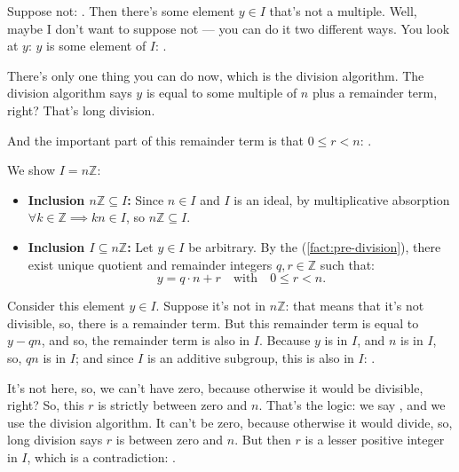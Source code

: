 \begin{proofWrapper}
\begin{speech}[00:53:46 - 00:54:50]
Suppose not: . Then there's some element $y \in I$ that's not a multiple. Well, maybe I don't want to suppose not --- you can do it two different ways. You look at $y$: $y$ is some element of $I$: .

There's only one thing you can do now, which is the division algorithm. The division algorithm says $y$ is equal to some multiple of $n$ plus a remainder term, right?  That's long division.

And the important part of this remainder term is that $0 \le r < n$: .
\end{speech}

\begin{content}
We show $I = n\mathbb{Z}$:
\begin{itemize}
    \item \textbf{Inclusion $n\mathbb{Z} \subseteq I$:} Since $n \in I$ and $I$ is an ideal, by multiplicative absorption $\forall k \in \mathbb{Z} \implies kn \in I$, so $n\mathbb{Z} \subseteq I$.
    \item \textbf{Inclusion $I \subseteq n\mathbb{Z}$:} Let $y \in I$ be arbitrary. By the  (\cref{fact:pre-division}), there exist unique quotient and remainder integers $q, r \in \mathbb{Z}$ such that:
    \begin{equation}\label{eq:division-remainder}
    y = q \cdot n + r \quad \text{with} \quad 0 \le r < n.
    \end{equation}
\end{itemize}
\end{content}

\begin{speech}[00:54:50 - 00:56:10]
Consider this element $y \in I$. Suppose it's not in $n\mathbb{Z}$: that means that it's not divisible, so, there is a remainder term. But this remainder term is equal to $y - qn$, and so, the remainder term is also in $I$. Because $y$ is in $I$, and $n$ is in $I$, so, $qn$ is in $I$; and since $I$ is an additive subgroup, this is also in $I$: .

It's not here, so, we can't have zero, because otherwise it would be divisible, right? So, this $r$ is strictly between zero and $n$. That's the logic: we say , and we use the division algorithm. It can't be zero, because otherwise it would divide, so, long division says $r$ is between zero and $n$. But then $r$ is a lesser positive integer in $I$, which is a contradiction: .


\end{speech}
\end{proofWrapper}
